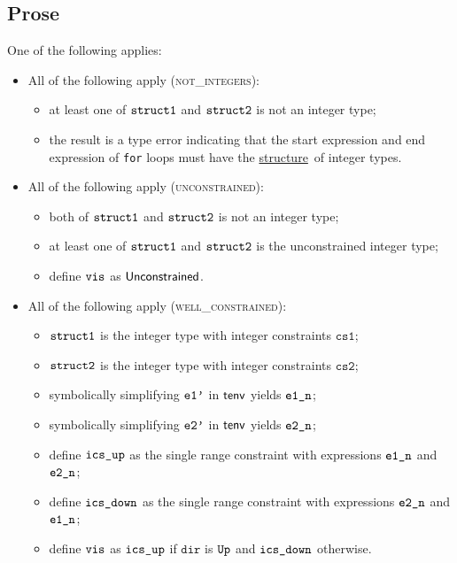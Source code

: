 \documentclass{book}
\newcommand\ProseOrTypeError[0]{\ProseTerminateAs{\TypeErrorConfig}}
\newcommand\structure[0]{\hyperlink{def-structure}{structure}}
\newcommand\dir[0]{\texttt{dir}}
\newcommand\csone[0]{\texttt{cs1}}
\newcommand\cstwo[0]{\texttt{cs2}}
\begin{document}
\subsection{Prose}
One of the following applies:
\begin{itemize}
  \item All of the following apply (\textsc{not\_integers}):
  \begin{itemize}
    \item at least one of $\texttt{struct1}$ and $\texttt{struct2}$ is not an integer type;
    \item the result is a type error indicating that the start expression and end expression of \texttt{for} loops
          must have the \structure\ of integer types.
  \end{itemize}

  \item All of the following apply (\textsc{unconstrained}):
  \begin{itemize}
    \item both of $\texttt{struct1}$ and $\texttt{struct2}$ is not an integer type;
    \item at least one of $\texttt{struct1}$ and $\texttt{struct2}$ is the unconstrained integer type;
    \item define $\texttt{vis}$ as $\textsf{Unconstrained}$.
  \end{itemize}

  \item All of the following apply (\textsc{well\_constrained}):
  \begin{itemize}
    \item $\texttt{struct1}$ is the integer type with integer constraints $\csone$;
    \item $\texttt{struct2}$ is the integer type with integer constraints $\cstwo$;
    \item symbolically simplifying $\texttt{e1'}$ in $\textsf{tenv}$ yields $\texttt{e1\_n}$\ProseOrTypeError;
    \item symbolically simplifying $\texttt{e2'}$ in $\textsf{tenv}$ yields $\texttt{e2\_n}$\ProseOrTypeError;
    \item define $\texttt{ics\_up}$ as the single range constraint with expressions $\texttt{e1\_n}$ and $\texttt{e2\_n}$;
    \item define $\texttt{ics\_down}$ as the single range constraint with expressions $\texttt{e2\_n}$ and $\texttt{e1\_n}$;
    \item define $\texttt{vis}$ as $\texttt{ics\_up}$ if $\dir$ is $\texttt{Up}$ and $\texttt{ics\_down}$ otherwise.
  \end{itemize}
\end{itemize}
\end{document}
